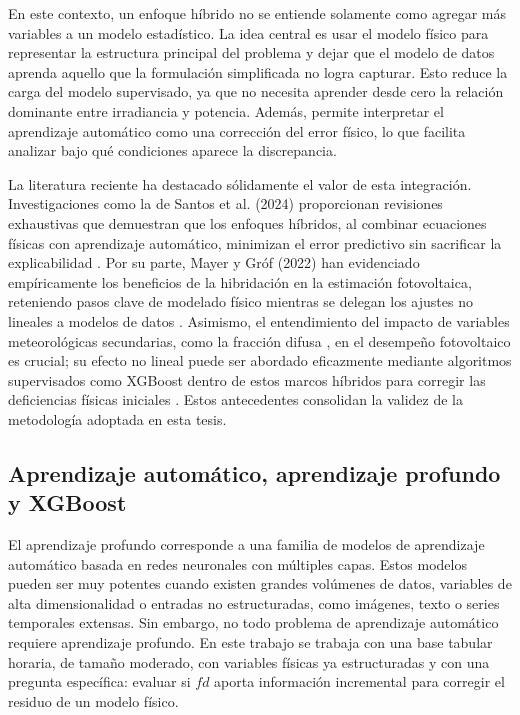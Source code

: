 \documentclass[12pt, letterpaper]{article}
\begin{document}
En este contexto, un enfoque h\'ibrido no se entiende solamente como agregar m\'as variables a un modelo estad\'istico. La idea central es usar el modelo f\'isico para representar la estructura principal del problema y dejar que el modelo de datos aprenda aquello que la formulaci\'on simplificada no logra capturar. Esto reduce la carga del modelo supervisado, ya que no necesita aprender desde cero la relaci\'on dominante entre irradiancia y potencia. Adem\'as, permite interpretar el aprendizaje autom\'atico como una correcci\'on del error f\'isico, lo que facilita analizar bajo qu\'e condiciones aparece la discrepancia.

La literatura reciente ha destacado s\'olidamente el valor de esta integraci\'on. Investigaciones como la de Santos et al. (2024) proporcionan revisiones exhaustivas que demuestran que los enfoques h\'ibridos, al combinar ecuaciones f\'isicas con aprendizaje autom\'atico, minimizan el error predictivo sin sacrificar la explicabilidad \cite{santos2024}. Por su parte, Mayer y Gr\'of (2022) han evidenciado emp\'iricamente los beneficios de la hibridaci\'on en la estimaci\'on fotovoltaica, reteniendo pasos clave de modelado f\'isico mientras se delegan los ajustes no lineales a modelos de datos \cite{mayer2022}. Asimismo, el entendimiento del impacto de variables meteorol\'ogicas secundarias, como la fracci\'on difusa \cite{erbs1982}, en el desempe\~no fotovoltaico es crucial; su efecto no lineal puede ser abordado eficazmente mediante algoritmos supervisados como XGBoost dentro de estos marcos h\'ibridos para corregir las deficiencias f\'isicas iniciales \cite{santos2024}. Estos antecedentes consolidan la validez de la metodolog\'ia adoptada en esta tesis.

\subsection{Aprendizaje autom\'atico, aprendizaje profundo y XGBoost}

El aprendizaje profundo corresponde a una familia de modelos de aprendizaje autom\'atico basada en redes neuronales con m\'ultiples capas. Estos modelos pueden ser muy potentes cuando existen grandes vol\'umenes de datos, variables de alta dimensionalidad o entradas no estructuradas, como im\'agenes, texto o series temporales extensas. Sin embargo, no todo problema de aprendizaje autom\'atico requiere aprendizaje profundo. En este trabajo se trabaja con una base tabular horaria, de tama\~no moderado, con variables f\'isicas ya estructuradas y con una pregunta espec\'ifica: evaluar si \(fd\) aporta informaci\'on incremental para corregir el residuo de un modelo f\'isico.
\end{document}
